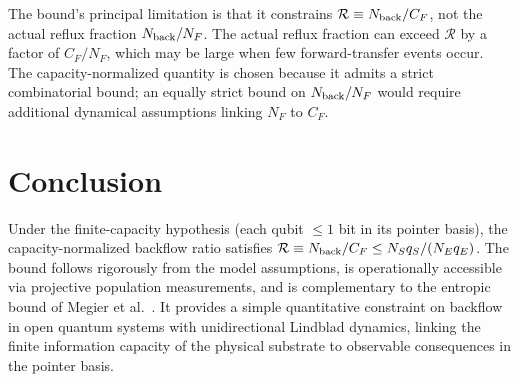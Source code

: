 \documentclass[aps,prl,twocolumn,superscriptaddress,hyperref]{revtex4-2}
\begin{document}
The bound's principal limitation is that it constrains $\mathcal{R} \equiv N_{\rm back}/C_F$, not the actual reflux fraction $N_{\rm back}/N_F$. The actual reflux fraction can exceed $\mathcal{R}$ by a factor of $C_F/N_F$, which may be large when few forward-transfer events occur. The capacity-normalized quantity is chosen because it admits a strict combinatorial bound; an equally strict bound on $N_{\rm back}/N_F$ would require additional dynamical assumptions linking $N_F$ to $C_F$.

\section{Conclusion}

Under the finite-capacity hypothesis (each qubit $\leq 1$ bit in its pointer basis), the capacity-normalized backflow ratio satisfies $\mathcal{R} \equiv N_{\rm back}/C_F \leq N_S q_S/(N_E q_E)$. The bound follows rigorously from the model assumptions, is operationally accessible via projective population measurements, and is complementary to the entropic bound of Megier et al.~\cite{Megier:2021}. It provides a simple quantitative constraint on backflow in open quantum systems with unidirectional Lindblad dynamics, linking the finite information capacity of the physical substrate to observable consequences in the pointer basis.
\end{document}
